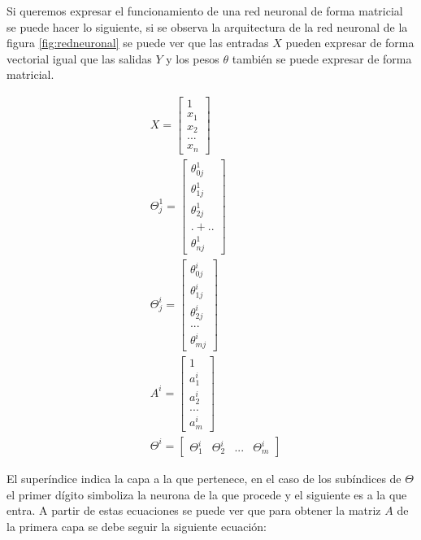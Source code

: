 \par Si queremos expresar el funcionamiento de una red neuronal de forma matricial se puede hacer lo siguiente, si se observa la arquitectura de la red neuronal de la figura \ref{fig:redneuronal} se puede ver que las entradas $X$ pueden expresar de forma vectorial igual que las salidas $Y$ y los pesos $\theta$ también se puede expresar de forma matricial.
\begin{spreadlines}{10pt}
	\begin{alignat}{4}
		\label{eq:1}
		& X=\begin{bmatrix}
		1\\
		x_{1}\\
		x_{2}\\
		...\\
		x_{n}
		\end{bmatrix} \\  \label{eq:2}
		& \Theta ^{1}_{j} =\begin{bmatrix}
		\theta ^{1}_{0j}\\
		\theta ^{1}_{1j}\\
		\theta ^{1}_{2j}\\
		.+..\\
		\theta ^{1}_{nj}
		\end{bmatrix} \\ \label{eq:3}
		& \Theta ^{i}_{j} =\begin{bmatrix}
		\theta ^{i}_{0j}\\
		\theta ^{i}_{1j}\\
		\theta ^{i}_{2j}\\
		...\\
		\theta ^{i}_{mj}
		\end{bmatrix}\\ \label{eq:4}
		& A^{i} =\begin{bmatrix}
		1\\
		a^{i}_{1}\\
		a^{i}_{2}\\
		...\\
		a^{i}_{m}
		\end{bmatrix}\\
		& \Theta ^{i} =\begin{bmatrix}
		\Theta ^{i}_{1} & \Theta ^{i}_{2} & ... & \Theta ^{i}_{m}\end{bmatrix} 
	\end{alignat}
\end{spreadlines}
		    
\par El superíndice indica la capa a la que pertenece, en el caso de los subíndices de $\Theta$ el primer dígito simboliza la neurona de la que procede y el siguiente es a la que entra. A partir de estas ecuaciones se puede ver que para obtener la matriz $A$ de la primera capa se debe seguir la siguiente ecuación:
		    

